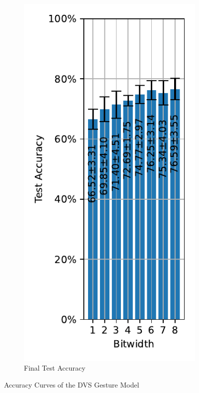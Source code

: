 \begin{figure}[H]
\begin{subfigure}[H]{0.3\textwidth}
                \centering
                \includegraphics[width=\textwidth]{../standard/DVSGesture/plots/dvsgesture_final_acc.pdf}
                \caption{Final Test Accuracy}
            \end{subfigure}
            \caption{Accuracy Curves of the DVS Gesture Model}
        \end{figure}

